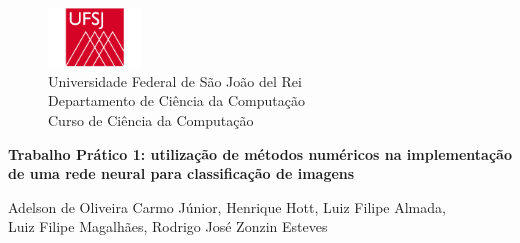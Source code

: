\begin{figure}[t]
	\centering
	\includegraphics[width=2.5cm]{ufsj}\\
	
	{\large Universidade Federal de São João del Rei\\
		Departamento de Ciência da Computação\\
		Curso de Ciência da Computação\\}
	\label{fig:ufsj}
\end{figure}
{\Large
	\begin{center}
		\textbf{Trabalho Prático 1: utilização de métodos numéricos na implementação de uma rede neural para classificação de imagens}
		
	\end{center}
}

{\large 
	
	\begin{center}
		Adelson de Oliveira Carmo Júnior, 
		Henrique Hott,
		Luiz Filipe Almada, \\
		Luiz Filipe Magalhães,
		Rodrigo José Zonzin Esteves
	\end{center}	
}